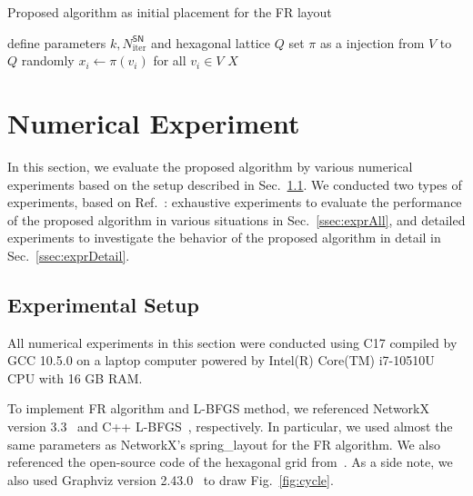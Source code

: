 \documentclass[dvipdfmx,journal]{IEEEtran}
\newcommand{\Cpp}{C\nolinebreak[4]\hspace{-.05em}\raisebox{.4ex}{\relsize{-3}{\textbf{++}}}}
\begin{document}
\begin{algorithm}[ht]
    \caption{Proposed algorithm as initial placement for the FR layout}
    \label{alg:proposed}

    define parameters $k, N_\mathrm{iter}^\mathsf{SN}$ and hexagonal lattice $Q$\;
    set $\pi$ as a injection from $V$ to $Q$ randomly\;
    $x_i \gets \pi(v_i)$ for all $v_i \in V$\;
        \Return $X$
\end{algorithm}

\section{Numerical Experiment} \label{sec:experiment}

In this section, we evaluate the proposed algorithm by various numerical experiments based on the setup described in Sec.~\ref{ssec:setup}.
We conducted two types of experiments, based on Ref.~\cite{8419285}:
exhaustive experiments to evaluate the performance of the proposed algorithm in various situations in Sec.~\ref{ssec:exprAll},
and detailed experiments to investigate the behavior of the proposed algorithm in detail in Sec.~\ref{ssec:exprDetail}.

\subsection{Experimental Setup}\label{ssec:setup}

All numerical experiments in this section were conducted using \Cpp17 compiled by GCC 10.5.0 on a laptop computer powered by Intel(R) Core(TM) i7-10510U CPU with 16 GB RAM.

To implement FR algorithm and L-BFGS method, we referenced NetworkX version 3.3~\cite{hagberg2008exploring} and C++ L-BFGS~\cite{qiuYixuanLBFGSpp2024,okazakiChokkanLiblbfgs2024}, respectively. In particular, we used almost the same parameters as NetworkX's \textsf{spring\_layout} for the FR algorithm.
We also referenced the open-source code of the hexagonal grid from~\cite{patelHexagonalGrids2013}.
As a side note, we also used Graphviz version 2.43.0~\cite{ellsonGraphvizOpenSource2002} to draw Fig.~\ref{fig:cycle}.
\end{document}
